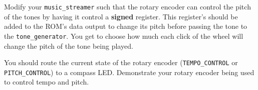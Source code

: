\documentclass[11pt]{article}
\begin{document}
Modify your \verb|music_streamer| such that the rotary encoder can control the pitch of the tones by having it control a \textbf{signed} register. This register's should be added to the ROM's data output to change its pitch before passing the tone to the \verb|tone_generator|. You get to choose how much each click of the wheel will change the pitch of the tone being played.

You should route the current state of the rotary encoder (\verb|TEMPO_CONTROL| or \verb|PITCH_CONTROL|) to a compass LED. Demonstrate your rotary encoder being used to control tempo and pitch.
\end{document}
